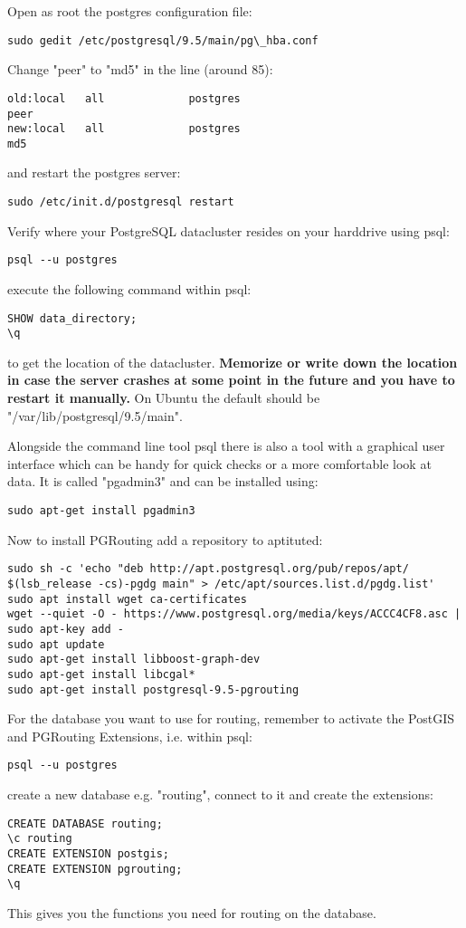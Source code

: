 \documentclass{article}
\begin{document}
Open as root the postgres configuration file:
\begin{verbatim}
sudo gedit /etc/postgresql/9.5/main/pg\_hba.conf
\end{verbatim}
Change "peer" to "md5" in the line (around 85):
\begin{verbatim}
old:local   all             postgres                                peer
new:local   all             postgres                                md5
\end{verbatim}
and restart the postgres server:
\begin{verbatim}
sudo /etc/init.d/postgresql restart
\end{verbatim}

Verify where your PostgreSQL datacluster resides on your harddrive
using psql:
\begin{verbatim}
psql --u postgres
\end{verbatim}
execute the following command within psql:
\begin{verbatim}
SHOW data_directory;
\q
\end{verbatim}
to get the location of the datacluster. \textbf{Memorize or write down the location in case the server crashes at some point in the future 
and you have to restart it manually.}
On Ubuntu the default should be "/var/lib/postgresql/9.5/main".

Alongside the command line tool psql there is also a tool
with a graphical user interface which can be handy for
quick checks or a more comfortable look at data.
It is called "pgadmin3" and can be installed using:
\begin{verbatim}
sudo apt-get install pgadmin3
\end{verbatim}


Now to install PGRouting add a repository to aptituted:
\begin{verbatim}
sudo sh -c 'echo "deb http://apt.postgresql.org/pub/repos/apt/ $(lsb_release -cs)-pgdg main" > /etc/apt/sources.list.d/pgdg.list'
sudo apt install wget ca-certificates
wget --quiet -O - https://www.postgresql.org/media/keys/ACCC4CF8.asc | sudo apt-key add -
sudo apt update
sudo apt-get install libboost-graph-dev
sudo apt-get install libcgal*
sudo apt-get install postgresql-9.5-pgrouting
\end{verbatim}

For the database you want to use for routing, remember to activate
the PostGIS and PGRouting Extensions, i.e. within psql:
\begin{verbatim}
psql --u postgres
\end{verbatim}
create a new database e.g. "routing", 
connect to it and create the extensions:
\begin{verbatim}
CREATE DATABASE routing;
\c routing
CREATE EXTENSION postgis;
CREATE EXTENSION pgrouting;
\q
\end{verbatim}
This gives you the functions you need for routing on the database.
\end{document}
